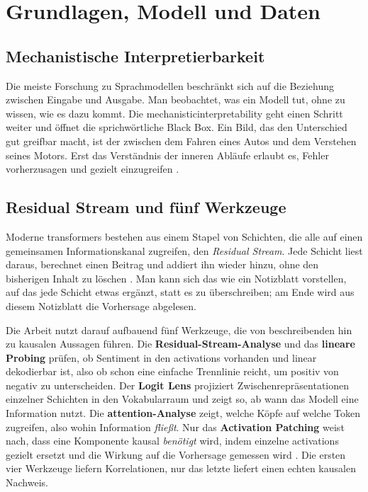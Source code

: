 \section{Grundlagen, Modell und Daten}

\subsection{Mechanistische Interpretierbarkeit}

Die meiste Forschung zu Sprachmodellen beschränkt sich auf die Beziehung zwischen Eingabe und Ausgabe. Man beobachtet, was ein Modell tut, ohne zu wissen, wie es dazu kommt. Die \gls{mechanisticinterpretability} geht einen Schritt weiter und öffnet die sprichwörtliche Black Box. Ein Bild, das den Unterschied gut greifbar macht, ist der zwischen dem Fahren eines Autos und dem Verstehen seines Motors. Erst das Verständnis der inneren Abläufe erlaubt es, Fehler vorherzusagen und gezielt einzugreifen \cite{nanda2023comprehensive}.

\subsection{Residual Stream und fünf Werkzeuge}

Moderne \glspl{transformer} bestehen aus einem Stapel von Schichten, die alle auf einen gemeinsamen Informationskanal zugreifen, den \emph{Residual Stream}. Jede Schicht liest daraus, berechnet einen Beitrag und addiert ihn wieder hinzu, ohne den bisherigen Inhalt zu löschen \cite{elhage2021mathematical}. Man kann sich das wie ein Notizblatt vorstellen, auf das jede Schicht etwas ergänzt, statt es zu überschreiben; am Ende wird aus diesem Notizblatt die Vorhersage abgelesen.

Die Arbeit nutzt darauf aufbauend fünf Werkzeuge, die von beschreibenden hin zu kausalen Aussagen führen. Die \textbf{Residual-Stream-Analyse} und das \textbf{lineare Probing} prüfen, ob Sentiment in den \glspl{activation} vorhanden und linear dekodierbar ist, also ob schon eine einfache Trennlinie reicht, um positiv von negativ zu unterscheiden. Der \textbf{Logit Lens} projiziert Zwischenrepräsentationen einzelner Schichten in den Vokabularraum \cite{nostalgebraist2020logit} und zeigt so, ab wann das Modell eine Information nutzt. Die \textbf{\gls{attention}-Analyse} zeigt, welche Köpfe auf welche Token zugreifen, also wohin Information \emph{fließt}. Nur das \textbf{Activation Patching} weist nach, dass eine Komponente kausal \emph{benötigt} wird, indem einzelne \glspl{activation} gezielt ersetzt und die Wirkung auf die Vorhersage gemessen wird \cite{meng2022locating, goldowskydill2023localizing}. Die ersten vier Werkzeuge liefern Korrelationen, nur das letzte liefert einen echten kausalen Nachweis.

